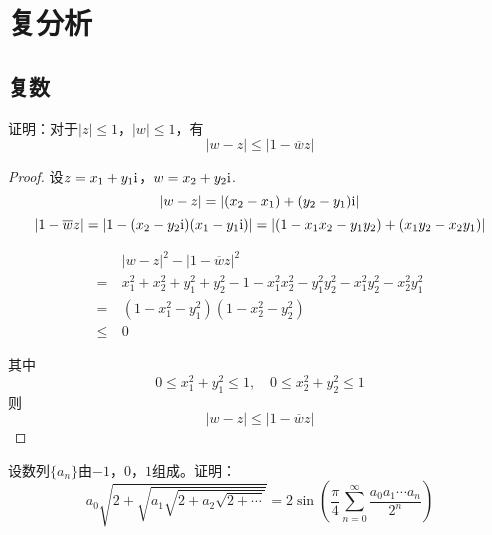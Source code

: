 \chapter{复分析}

\section{复数}

\begin{proposition}
    
    证明：对于$|z| \leq 1$，$|w| \leq 1$，有
    \[|w - z| \leq |1 - \overline{w}z|\]

\end{proposition}

\begin{proof}

    设$z = x_1 + y_1\mathrm{i}$，$w = x_2 + y_2\mathrm{i}$.
    \[|w - z| = | (x_2 - x_1) + (y_2 - y_1)\mathrm{i}| \]
    \[|1 - \overline{w}z| = |1 - (x_2 - y_2\mathrm{i}) (x_1 - y_1\mathrm{i})| = | (1 - x_1x_2 - y_1y_2) + (x_1y_2 - x_2y_1) |\]

    \begin{align*}
        &|w - z|^2 - |1 - \overline{w}z|^2 \\
        = \ & x_1^2 + x_2^2 + y_1^2 + y_2^2 - 1 - x_1^2x_2^2 -  y_1^2y_2^2 - x_1^2 y_2^2 -  x_2^2y_1^2 \\
        = \ & (1 - x_1^2 - y_1^2) (1 - x_2^2 - y_2^2) \\
        \leq \ & 0
    \end{align*}

    其中
    \[0 \leq x_1^2 + y_1^2 \leq 1, \quad 0 \leq x_2^2 + y_2^2 \leq 1\]
    则
    \[|w - z| \leq |1 - \overline{w}z|\]

\end{proof}

\begin{proposition}

    设数列$\{a_n\}$由$-1$，$0$，$1$组成。证明：
    \[a_0\sqrt{2 + \sqrt{a_1 \sqrt{2 + a_2\sqrt{2 + \cdots}}}} = 2 \sin{\left( \dfrac{\pi}{4} \sum\limits_{n = 0}^{\infty}{\dfrac{a_0 a_1 \cdots a_n}{2^n}} \right)}\]

\end{proposition}

